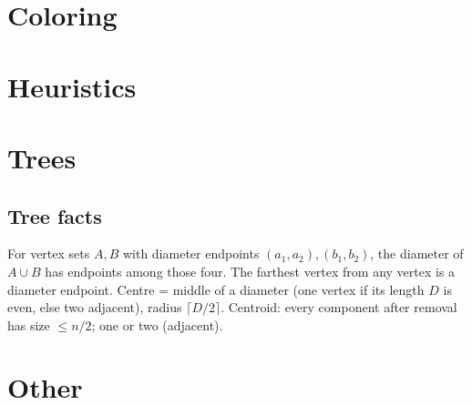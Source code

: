 \section{Coloring}

\section{Heuristics}

\section{Trees}
	\subsection{Tree facts}
	For vertex sets $A,B$ with diameter endpoints $(a_1,a_2),(b_1,b_2)$, the diameter of $A\cup B$ has endpoints among those four. The farthest vertex from any vertex is a diameter endpoint. Centre = middle of a diameter (one vertex if its length $D$ is even, else two adjacent), radius $\lceil D/2\rceil$.
	Centroid: every component after removal has size $\le n/2$; one or two (adjacent).


\section{Other}
